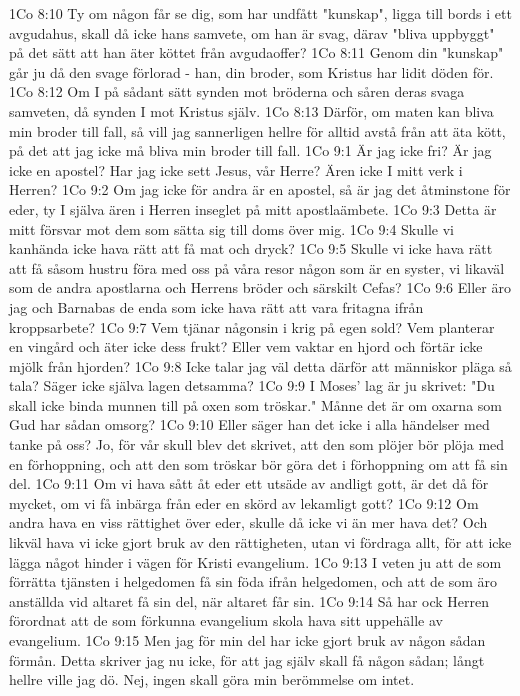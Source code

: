 1Co 8:10  Ty om någon får se dig, som har undfått "kunskap", ligga till bords i ett avgudahus, skall då icke hans samvete, om han är svag, därav "bliva uppbyggt" på det sätt att han äter köttet från avgudaoffer?
1Co 8:11  Genom din "kunskap" går ju då den svage förlorad - han, din broder, som Kristus har lidit döden för.
1Co 8:12  Om I på sådant sätt synden mot bröderna och såren deras svaga samveten, då synden I mot Kristus själv.
1Co 8:13  Därför, om maten kan bliva min broder till fall, så vill jag sannerligen hellre för alltid avstå från att äta kött, på det att jag icke må bliva min broder till fall.
1Co 9:1  Är jag icke fri? Är jag icke en apostel? Har jag icke sett Jesus, vår Herre? Ären icke I mitt verk i Herren?
1Co 9:2  Om jag icke för andra är en apostel, så är jag det åtminstone för eder, ty I själva ären i Herren inseglet på mitt apostlaämbete.
1Co 9:3  Detta är mitt försvar mot dem som sätta sig till doms över mig.
1Co 9:4  Skulle vi kanhända icke hava rätt att få mat och dryck?
1Co 9:5  Skulle vi icke hava rätt att få såsom hustru föra med oss på våra resor någon som är en syster, vi likaväl som de andra apostlarna och Herrens bröder och särskilt Cefas?
1Co 9:6  Eller äro jag och Barnabas de enda som icke hava rätt att vara fritagna ifrån kroppsarbete?
1Co 9:7  Vem tjänar någonsin i krig på egen sold? Vem planterar en vingård och äter icke dess frukt? Eller vem vaktar en hjord och förtär icke mjölk från hjorden?
1Co 9:8  Icke talar jag väl detta därför att människor pläga så tala? Säger icke själva lagen detsamma?
1Co 9:9  I Moses' lag är ju skrivet: "Du skall icke binda munnen till på oxen som tröskar." Månne det är om oxarna som Gud har sådan omsorg?
1Co 9:10  Eller säger han det icke i alla händelser med tanke på oss? Jo, för vår skull blev det skrivet, att den som plöjer bör plöja med en förhoppning, och att den som tröskar bör göra det i förhoppning om att få sin del.
1Co 9:11  Om vi hava sått åt eder ett utsäde av andligt gott, är det då för mycket, om vi få inbärga från eder en skörd av lekamligt gott?
1Co 9:12  Om andra hava en viss rättighet över eder, skulle då icke vi än mer hava det? Och likväl hava vi icke gjort bruk av den rättigheten, utan vi fördraga allt, för att icke lägga något hinder i vägen för Kristi evangelium.
1Co 9:13  I veten ju att de som förrätta tjänsten i helgedomen få sin föda ifrån helgedomen, och att de som äro anställda vid altaret få sin del, när altaret får sin.
1Co 9:14  Så har ock Herren förordnat att de som förkunna evangelium skola hava sitt uppehälle av evangelium.
1Co 9:15  Men jag för min del har icke gjort bruk av någon sådan förmån. Detta skriver jag nu icke, för att jag själv skall få någon sådan; långt hellre ville jag dö. Nej, ingen skall göra min berömmelse om intet.

